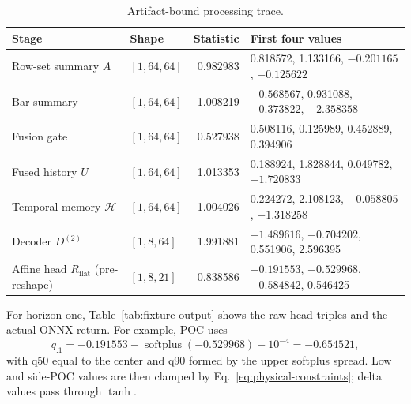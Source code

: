 \documentclass[10pt]{article}
\newcommand{\softplus}{\operatorname{softplus}}
\begin{document}
\begin{table}[H]
\centering
\footnotesize
\caption{Artifact-bound processing trace.}
\label{tab:fixture-trace}
\begin{tabular}{@{}l l r l@{}}
\toprule
Stage & Shape & Statistic & First four values \\
\midrule
Row-set summary $A$ & $[1,64,64]$ & 0.982983 & 0.818572, 1.133166, $-0.201165$, $-0.125622$ \\
Bar summary & $[1,64,64]$ & 1.008219 & $-0.568567$, 0.931088, $-0.373822$, $-2.358358$ \\
Fusion gate & $[1,64,64]$ & 0.527938 & 0.508116, 0.125989, 0.452889, 0.394906 \\
Fused history $U$ & $[1,64,64]$ & 1.013353 & 0.188924, 1.828844, 0.049782, $-1.720833$ \\
Temporal memory $\mathcal H$ & $[1,64,64]$ & 1.004026 & 0.224272, 2.108123, $-0.058805$, $-1.318258$ \\
Decoder $D^{(2)}$ & $[1,8,64]$ & 1.991881 & $-1.489616$, $-0.704202$, 0.551906, 2.596395 \\
Affine head $R_{\mathrm{flat}}$ (pre-reshape) & $[1,8,21]$ & 0.838586 & $-0.191553$, $-0.529968$, $-0.584842$, 0.546425 \\
\bottomrule
\end{tabular}
\end{table}

For horizon one, Table~\ref{tab:fixture-output} shows the raw head triples and the actual ONNX return.
For example, POC uses
\begin{equation}
q_{.1}=-0.191553-\softplus(-0.529968)-10^{-4}=-0.654521,
\end{equation}
with q50 equal to the center and q90 formed by the upper softplus spread. Low and side-POC values are
then clamped by Eq.~\eqref{eq:physical-constraints}; delta values pass through $\tanh$.
\end{document}
